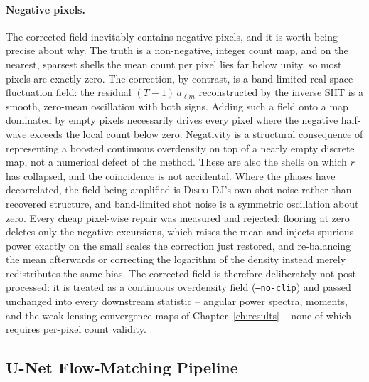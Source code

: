 \documentclass{report}
\begin{document}
\paragraph{Negative pixels.} The corrected field inevitably contains negative pixels, and it is worth being precise about why. The truth is a non-negative, integer count map, and on the nearest, sparsest shells the mean count per pixel lies far below unity, so most pixels are exactly zero. The correction, by contrast, is a band-limited real-space fluctuation field: the residual $(T-1)\,a_{\ell m}$ reconstructed by the inverse SHT is a smooth, zero-mean oscillation with both signs. Adding such a field onto a map dominated by empty pixels necessarily drives every pixel where the negative half-wave exceeds the local count below zero. Negativity is a structural consequence of representing a boosted continuous overdensity on top of a nearly empty discrete map, not a numerical defect of the method. These are also the shells on which \mbox{$r$} has collapsed, and the coincidence is not accidental. Where the phases have decorrelated, the field being amplified is \textsc{Disco-DJ}'s own shot noise rather than recovered structure, and band-limited shot noise is a symmetric oscillation about zero. Every cheap pixel-wise repair was measured and rejected: flooring at zero deletes only the negative excursions, which raises the mean and injects spurious power exactly on the small scales the correction just restored, and re-balancing the mean afterwards or correcting the logarithm of the density instead merely redistributes the same bias. The corrected field is therefore deliberately not post-processed: it is treated as a continuous overdensity field (\texttt{--no-clip}) and passed unchanged into every downstream statistic -- angular power spectra, moments, and the weak-lensing convergence maps of Chapter~\ref{ch:results} -- none of which requires per-pixel count validity.


\subsection{U-Net Flow-Matching Pipeline}
\label{subsec:pipe-unet-flow}
\end{document}
